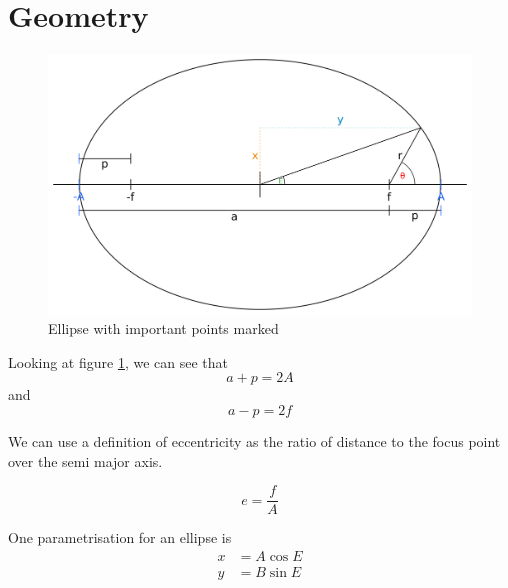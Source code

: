 \documentclass[a5paper,12pt]{article}
\begin{document}

\clearpage
\tableofcontents
\listoftables
\listoffigures
\clearpage

\section{Geometry}
\begin{figure}[h]
  \centering
  \includegraphics[width=\textwidth]{./img/diagram}
\caption{Ellipse with important points marked} \label{fig:geometry}
\end{figure}

Looking at figure \ref{fig:geometry}, we can see that
\begin{equation}
a+p=2A
\end{equation}
and
\begin{equation}
a-p=2f
\end{equation}

We can use a definition of eccentricity as the ratio of distance to the focus point over the semi major axis.

\begin{equation}
e=\frac{f}{A}
\end{equation}

One parametrisation for an ellipse is
\begin{align}
	x&=A\cos E \\ \nonumber
	y&=B\sin E
\end{align}
\end{document}
